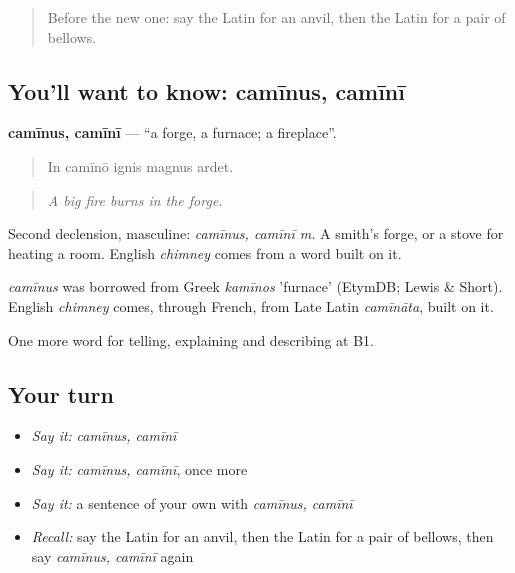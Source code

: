 \label{lesson:LA-C469-caminus}



\begin{quote}
Before the new one: say the Latin for an anvil, then the Latin for a pair of bellows.
\end{quote}

\subsection*{You'll want to know: camīnus, camīnī}
\textbf{camīnus, camīnī} — \textquotedblleft{}a forge, a furnace; a fireplace\textquotedblright{}.

\begin{quote}
In camīnō ignis magnus ardet.
\end{quote}

\begin{quote}
\emph{A big fire burns in the forge.}
\end{quote}

Second declension, masculine: \emph{camīnus, camīnī m.} A smith's forge, or a stove for heating a room. English \emph{chimney} comes from a word built on it.

\begin{cousinweb}
\emph{camīnus} was borrowed from Greek \emph{kamīnos} 'furnace' (EtymDB; Lewis \& Short). English \emph{chimney} comes, through French, from Late Latin \emph{camīnāta}, built on it.
\end{cousinweb}

\begin{grammarlens}[title={What you've built}]
One more word for telling, explaining and describing at B1.
\end{grammarlens}

\subsection*{Your turn}
\begin{itemize}
\raggedright
  \item \emph{Say it:} \emph{camīnus, camīnī}
  \item \emph{Say it:} \emph{camīnus, camīnī}, once more
  \item \emph{Say it:} a sentence of your own with \emph{camīnus, camīnī}
  \item \emph{Recall:} say the Latin for an anvil, then the Latin for a pair of bellows, then say \emph{camīnus, camīnī} again
\end{itemize}

